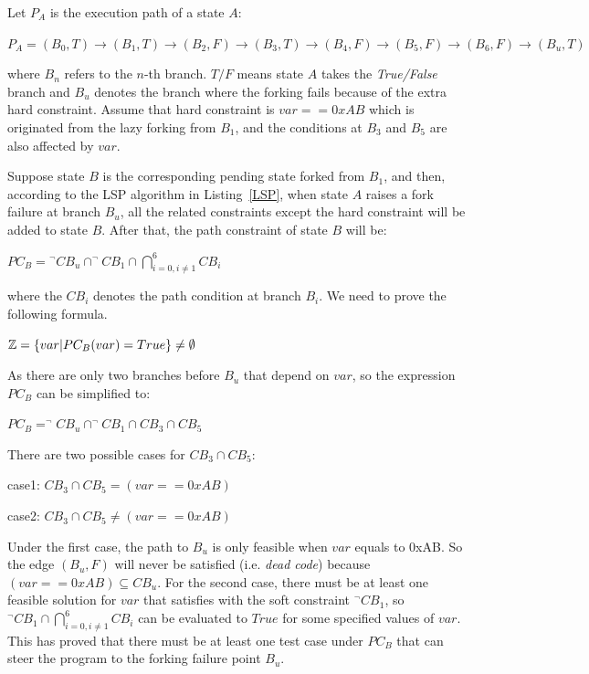 Let $P_A$ is the execution path of a state $A$:
\begin{center}
$P_A = (B_0,T) \rightarrow (B_1,T) \rightarrow (B_2,F) \rightarrow (B_3,T)
\rightarrow (B_4,F) \rightarrow (B_5,F) \rightarrow (B_6,F) \rightarrow (B_u,T)$
\end{center}

\noindent where $B_n$ refers to the $n$-th branch. $T/F$ means state $A$ takes the \emph{True/False} branch and $B_u$ denotes the branch where the forking fails because of the extra hard constraint. Assume that hard constraint is $var==0xAB$ which is originated from the lazy forking from $B_1$, and the conditions at $B_3$ and $B_5$ are also affected by $var$.


Suppose state $B$ is the corresponding pending state forked from $B_1$, and then, according to the LSP algorithm in Listing~\ref{LSP}, when state $A$ raises a fork failure at branch $B_u$, all the related constraints except the hard constraint will be added to state $B$. After that, the path constraint of state $B$ will be:
\begin{center}
$PC_B = \displaystyle ^\neg CB_u \cap ^\neg CB_1 \cap \bigcap\limits_{i=0,i \neq 1}^{6} CB_i$
\end{center}
\noindent where the $CB_i$ denotes the path condition at branch $B_i$. We need to prove the following formula.
\begin{center}
$\mathbb{Z} = \{var\arrowvert PC_B(var) = True\} \neq \emptyset$
\end{center}

As there are only two branches before $B_u$ that depend on $var$, so the expression $PC_B$ can be simplified to:
\begin{center}
$PC_B = ^\neg CB_u \cap ^\neg CB_1 \cap CB_3 \cap CB_5$
\end{center}

There are two possible cases for $CB_3 \cap CB_5$:
\begin{center}
case1: $CB_3 \cap CB_5 = (var == 0xAB)$

case2: $CB_3 \cap CB_5 \neq (var == 0xAB)$
\end{center}

Under the first case, the path to $B_u$ is only feasible when $var$ equals to 0xAB. So the edge $(B_u, F)$ will never be satisfied (i.e. \emph{dead code}) because $(var == 0xAB) \subseteq CB_u$. For the second case, there must be at least one feasible solution for $var$ that satisfies with the soft constraint $^\neg CB_1$, so $^\neg CB_1 \cap \bigcap_{i=0,i \neq 1}^{6} CB_i$ can be evaluated to $True$ for some specified values of $var$. This has proved that there must be at least one test case under $PC_B$ that can steer the program to the forking failure point $B_u$.

